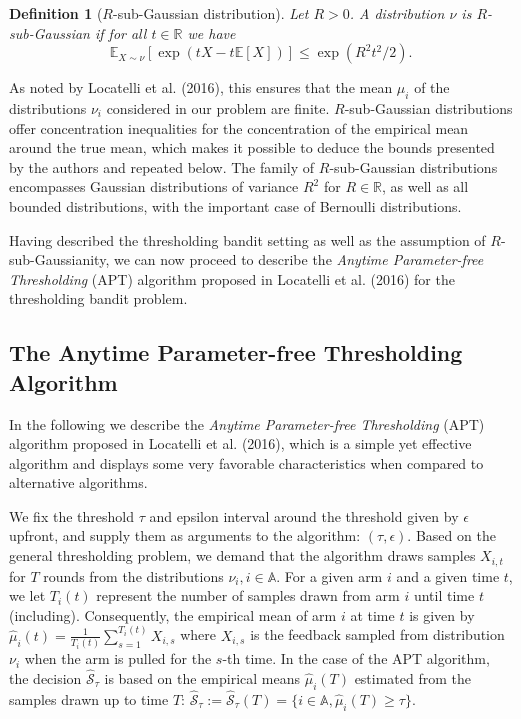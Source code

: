 \documentclass[11pt,]{article}
\newtheorem{definition}{Definition}
\begin{document}
\begin{definition}[$R$-sub-Gaussian distribution] 
\label{definition:rsubgaussian}
Let $R > 0$. A distribution $\nu$ is $R$-sub-Gaussian if for all $t \in \mathbb{R}$ we have
\begin{equation*}
\mathbb{E}_{X \sim \nu}[\exp(tX - t\mathbb{E}[X])] \leq \exp(R^2t^2/2).
\end{equation*}
\end{definition}

As noted by Locatelli et al. (2016), this ensures that the mean
\(\mu_i\) of the distributions \(\nu_i\) considered in our problem are
finite. \(R\)-sub-Gaussian distributions offer concentration
inequalities for the concentration of the empirical mean around the true
mean, which makes it possible to deduce the bounds presented by the
authors and repeated below. The family of \(R\)-sub-Gaussian
distributions encompasses Gaussian distributions of variance \(R^2\) for
\(R \in \mathbb{R}\), as well as all bounded distributions, with the
important case of Bernoulli distributions.

Having described the thresholding bandit setting as well as the
assumption of \(R\)-sub-Gaussianity, we can now proceed to describe the
\emph{Anytime Parameter-free Thresholding} (APT) algorithm proposed in
Locatelli et al. (2016) for the thresholding bandit problem.

\subsection{\texorpdfstring{The Anytime Parameter-free Thresholding
Algorithm
\label{sec:TheAPTAlgorithm}}{The Anytime Parameter-free Thresholding Algorithm }}\label{the-anytime-parameter-free-thresholding-algorithm}

In the following we describe the \emph{Anytime Parameter-free
Thresholding} (APT) algorithm proposed in Locatelli et al. (2016), which
is a simple yet effective algorithm and displays some very favorable
characteristics when compared to alternative algorithms.

We fix the threshold \(\tau\) and epsilon interval around the threshold
given by \(\epsilon\) upfront, and supply them as arguments to the
algorithm: \((\tau, \epsilon)\). Based on the general thresholding
problem, we demand that the algorithm draws samples \(X_{i,t}\) for
\(T\) rounds from the distributions \(\nu_i, i\in \mathbb{A}\). For a
given arm \(i\) and a given time \(t\), we let \(T_i(t)\) represent the
number of samples drawn from arm \(i\) until time \(t\) (including).
Consequently, the empirical mean of arm \(i\) at time \(t\) is given by
\(\hat{\mu}_i(t) = \frac{1}{T_i(t)} \sum_{s=1}^{T_i(t)} X_{i,s}\) where
\(X_{i,s}\) is the feedback sampled from distribution \(\nu_i\) when the
arm is pulled for the \(s\)-th time. In the case of the APT algorithm,
the decision \(\hat{\mathcal{S}}_{\tau}\) is based on the empirical
means \(\hat{\mu}_i(T)\) estimated from the samples drawn up to time
\(T\):
\(\hat{\mathcal{S}}_{\tau} := \hat{\mathcal{S}}_{\tau}(T) = \{i \in \mathbb{A}, \hat{\mu}_i(T) \geq \tau\}\).
\end{document}
